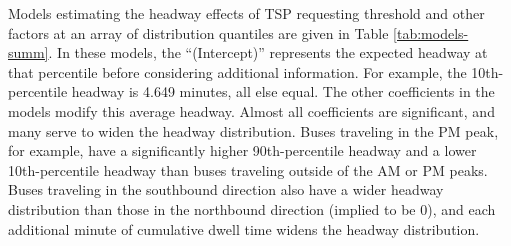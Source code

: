 \documentclass[3p, authoryear, review]{elsarticle} %
\begin{document}
Models estimating the headway effects of TSP requesting threshold and other factors
at an array of distribution quantiles are given in Table \ref{tab:models-summ}.
In these models, the ``(Intercept)'' represents the expected headway at that percentile
before considering additional information. For example, the 10th-percentile headway
is 4.649 minutes, all else equal. The other
coefficients in the models modify this average headway. Almost all coefficients are
significant, and many serve to widen the headway distribution.
Buses traveling in the PM peak, for example, have a significantly higher
90th-percentile headway and a lower 10th-percentile headway than buses
traveling outside of the AM or PM peaks. Buses traveling in the
southbound direction also have a wider headway distribution than those in the
northbound direction (implied to be \(0\)), and each additional minute of cumulative dwell
time widens the headway distribution.
\end{document}
